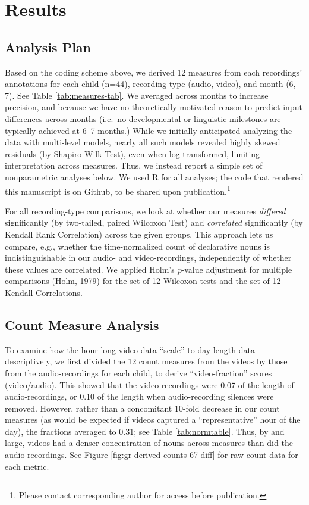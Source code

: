 \documentclass[man]{apa6}
\theoremstyle{definition}
\theoremstyle{definition}
\theoremstyle{definition}
\theoremstyle{remark}
\begin{document}
\section{Results}\label{results}

\subsection{Analysis Plan}\label{analysis-plan}

Based on the coding scheme above, we derived 12 measures from each
recordings' annotations for each child (n=44), recording-type (audio,
video), and month (6, 7). See Table \ref{tab:measures-tab}. We averaged
across months to increase precision, and because we have no
theoretically-motivated reason to predict input differences across
months (i.e.~no developmental or linguistic milestones are typically
achieved at 6--7 months.) While we initially anticipated analyzing the
data with multi-level models, nearly all such models revealed highly
skewed residuals (by Shapiro-Wilk Test), even when log-transformed,
limiting interpretation across measures. Thus, we instead report a
simple set of nonparametric analyses below. We used R for all analyses;
the code that rendered this manuscript is on Github, to be shared upon
publication.\footnote{Please contact corresponding author for access before publication.}

For all recording-type comparisons, we look at whether our measures
\emph{differed} significantly (by two-tailed, paired Wilcoxon Test) and
\emph{correlated} significantly (by Kendall Rank Correlation) across the
given groups. This approach lets us compare, e.g., whether the
time-normalized count of declarative nouns is indistinguishable in our
audio- and video-recordings, independently of whether these values are
correlated. We applied Holm's \emph{p}-value adjustment for multiple
comparisons (Holm, 1979) for the set of 12 Wilcoxon tests and the set of
12 Kendall Correlations.

\subsection{Count Measure Analysis}\label{count-measure-analysis}

To examine how the hour-long video data \enquote{scale} to day-length
data descriptively, we first divided the 12 count measures from the
videos by those from the audio-recordings for each child, to derive
\enquote{video-fraction} scores (video/audio). This showed that the
video-recordings were 0.07 of the length of audio-recordings, or 0.10 of
the length when audio-recording silences were removed. However, rather
than a concomitant 10-fold decrease in our count measures (as would be
expected if videos captured a \enquote{representative} hour of the day),
the fractions averaged to 0.31; see Table \ref{tab:normtable}. Thus, by
and large, videos had a denser concentration of nouns across measures
than did the audio-recordings. See Figure
\ref{fig:gr-derived-counts-67-diff} for raw count data for each metric.
\end{document}
